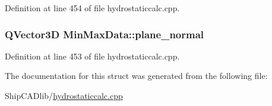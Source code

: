 Definition at line 454 of file hydrostaticcalc.\+cpp.

\subsubsection[{\texorpdfstring{plane\+\_\+normal}{plane_normal}}]{\setlength{\rightskip}{0pt plus 5cm}Q\+Vector3D Min\+Max\+Data\+::plane\+\_\+normal}\hypertarget{structMinMaxData_a62b4b4d97aba034731cdb0f11b23d856}{}\label{structMinMaxData_a62b4b4d97aba034731cdb0f11b23d856}


Definition at line 453 of file hydrostaticcalc.\+cpp.



The documentation for this struct was generated from the following file\+:\begin{DoxyCompactItemize}
\item 
Ship\+C\+A\+Dlib/\hyperlink{hydrostaticcalc_8cpp}{hydrostaticcalc.\+cpp}\end{DoxyCompactItemize}
